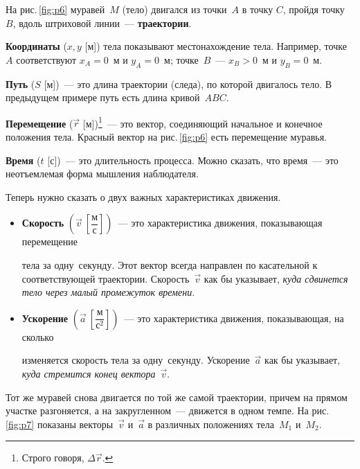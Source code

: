\documentclass[main.tex]{subfiles}
\begin{document}
%     



На рис.\,\ref{fig:p6} муравей~$M$ (тело) двигался из точки~$A$ в точку $C$, пройдя точку~$B$, вдоль штриховой линии~--- \textbf{траектории}.

\textbf{Координаты} ($x,y$ [м]) тела показывают местонахождение тела. Например, точке~$A$ соответствуют $x_A=0$~м и $y_A=0$~м; точке~$B$~--- $x_B>0$~м и $y_B=0$~м.

\textbf{Путь} ($S$ [м])~--- это длина траектории (следа), по которой двигалось тело. В предыдущем примере путь есть длина кривой~$ABC$. 

\textbf{Перемещение} ($\vec r$ [м])\footnote{Строго говоря, $\Delta \vec r$.}~--- это вектор, соединяющий начальное и конечное положения тела. Красный вектор
на рис.\,\ref{fig:p6} есть перемещение муравья.

\textbf{Время} ($t$ [с])~--- это длительность процесса. Можно сказать, что время~--- это неотъемлемая форма мышления наблюдателя.

Теперь нужно сказать о двух  важных характеристиках движения.
\begin{itemize}
    \item \textbf{Скорость} $\left(\vec v\ \left[\dfrac{\text{м}}{\text{с}}\right]\right)$~--- это характеристика движения, показывающая перемещение \strut тела за одну~секунду. Этот вектор всегда направлен по касательной к соответствующей траектории. Скорость~$\vec v$ как бы указывает, \emph{куда сдвинется тело через малый промежуток времени}.
    \item \textbf{Ускорение} $\left(\vec a\ \left[\dfrac{\text{м}}{\text{с}^2}\right]\right)$~--- это характеристика движения, показывающая, на сколько \strut изменяется скорость тела за одну~секунду. Ускорение~$\vec a$ как бы указывает, \emph{куда стремится конец вектора}~$\vec v$.
\end{itemize}

Тот же муравей снова двигается по той же самой траектории, причем на прямом участке разгоняется, а на закругленном~--- движется в одном темпе. На рис.\,\ref{fig:p7} показаны векторы~$\vec v$ и~$\vec a$ в различных положениях тела~$M_1$ и~$M_2$. 
\end{document}
